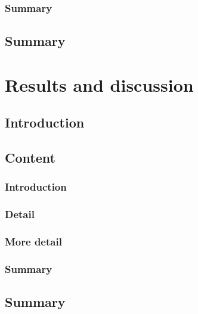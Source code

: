     \subsubsection{Summary}
      \lipsum[1] %
  
  \subsection{Summary}
    \lipsum[6] %



\section{Results and discussion} \label{sec:results}

  \subsection{Introduction}
    \lipsum[1] %
  
  \subsection{Content}
    \subsubsection{Introduction}
	\lipsum[1] %
	
	\subsubsection{Detail}
        \lipsum[7-11] %
    
	\subsubsection{More detail}
	\lipsum[1-3] %
	
	\subsubsection{Summary}
	\lipsum[1] %
  
  \subsection{Summary}
    \lipsum[6] %



